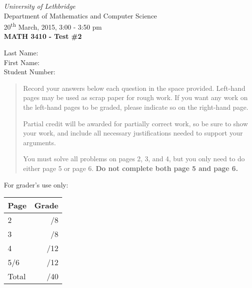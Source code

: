 \documentclass[12pt]{article}
\newcommand{\skipline}{\vspace{12pt}}
\begin{document}
\author{Instructor: Sean Fitzpatrick}
\thispagestyle{plain}
\begin{center}
\emph{University of Lethbridge}\\
Department of Mathematics and Computer Science\\
20\textsuperscript{th} March, 2015, 3:00 - 3:50 pm\\
{\bf MATH 3410 - Test \#2}\\
\end{center}
\skipline \skipline \skipline \noindent \skipline
Last Name:\underline{\hspace{50pt}{\bf Solutions}\hspace{248pt}}\\
\skipline
First Name:\underline{\hspace{50pt}{\bf The}\hspace{275pt}}\\
\skipline
Student Number:\underline{\hspace{323pt}}\\
\skipline



\vspace{0.5in}


\begin{quote}
 {Record your answers below each question in the space provided.    Left-hand pages may be used as scrap paper for rough work.  If you want any work on the left-hand pages to be graded, please indicate so on the right-hand page.
 
 \bigskip
 
Partial credit will be awarded for partially correct work, so be sure to show your work, and include all necessary justifications needed to support your arguments.}

 \bigskip

You must solve all problems on pages 2, 3, and 4, but you only need to do either page 5 or page 6. {\bf Do not complete both page 5 and page 6.}
\end{quote}


\vspace{0.5in}

For grader's use only:

\begin{table}[hbt]
\begin{center}
\begin{tabular}{|l|r|} \hline
Page&Grade\\
\hline \hline
\cline{1-2} 2 & \enspace\enspace\enspace\enspace\enspace\enspace/8\\
\cline{1-2} 3 & \enspace\enspace\enspace\enspace\enspace\enspace/8\\
\cline{1-2} 4 & \enspace\enspace\enspace\enspace\enspace\enspace/12\\
\cline{1-2} 5/6 & \enspace\enspace\enspace\enspace\enspace\enspace/12\\
\cline{1-2} Total & \enspace\enspace\enspace\enspace\enspace\enspace/40\\
\hline
\end{tabular}




\end{center}
\end{table}
\newpage
\end{document}
